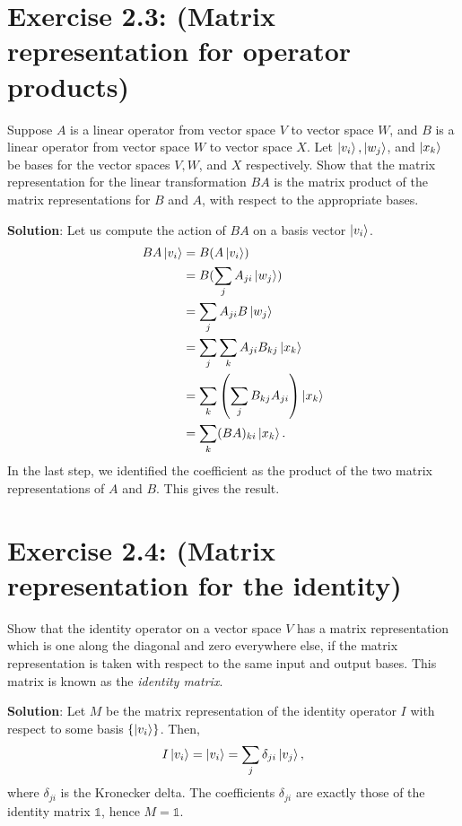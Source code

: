 \documentclass{book}
\begin{document}
\section*{Exercise 2.3: (Matrix representation for operator products)}
    Suppose $A$ is a linear operator from vector space $V$ to vector space $W$, and $B$ is a linear operator from vector space $W$ to vector space $X$. Let $\ket{v_i}, \ket{w_j}$, and $\ket{x_k}$ be bases for the vector spaces $V, W$, and $X$ respectively. Show that the matrix representation for the linear transformation $BA$ is the matrix product of the matrix representations for $B$ and $A$, with respect to the appropriate bases.
    
    \textbf{Solution}: Let us compute the action of $BA$ on a basis vector $\ket{v_i}$.
    \begin{align}
    \begin{aligned}
        BA\ket{v_i} &= B(A\ket{v_i}) \\
        &= B(\sum_j A_{ji}\ket{w_j}) \\
        &= \sum_j A_{ji}B\ket{w_j} \\
        &= \sum_j\sum_k A_{ji}B_{kj}\ket{x_k} \\
        &= \sum_k \left(\sum_j B_{kj}A_{ji}\right) \ket{x_k} \\
        &= \sum_k (BA)_{ki} \ket{x_k}.
    \end{aligned}
    \end{align}
    In the last step, we identified the coefficient as the product of the two matrix representations of $A$ and $B$. This gives the result.
    
\section*{Exercise 2.4: (Matrix representation for the identity)}
    Show that the identity operator on a vector space $V$ has a matrix representation which is one along the diagonal and zero everywhere else, if the matrix representation is taken with respect to the same input and output bases. This matrix is known as the \emph{identity matrix}.
    
    \textbf{Solution}: Let $M$ be the matrix representation of the identity operator $I$ with respect to some basis $\left\{\ket{v_i}\right\}$. Then,
    \begin{align}
        I\ket{v_i} = \ket{v_i} = \sum_j \delta_{ji}\ket{v_j},
    \end{align}
    where $\delta_{ji}$ is the Kronecker delta. The coefficients $\delta_{ji}$ are exactly those of the identity matrix $\mathbb{1}$, hence $M = \mathbb{1}$.
    
\end{document}
